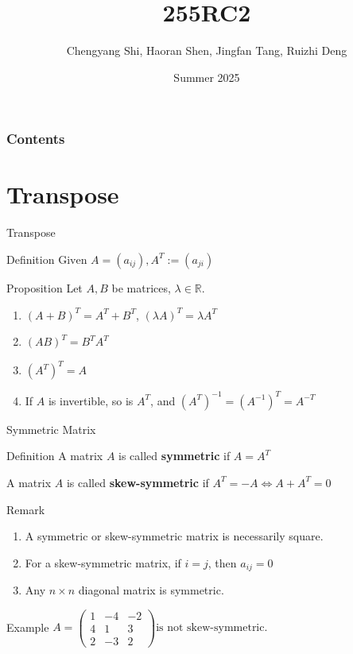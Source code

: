 \documentclass[aspectratio=169, UTF8]{ctexbeamer}
\title{\LARGE 255RC2}
\author{Chengyang Shi, Haoran Shen, Jingfan Tang, Ruizhi Deng}
\date{Summer 2025}
\begin{document}
\maketitle


\begin{frame}
    \frametitle{Contents}
    \tableofcontents     %
\end{frame}






\section{Transpose}
\begin{frame}{Transpose}
    \begin{block}{Definition}
        $\text{Given } A = (a_{ij}), A^T := (a_{ji})$
    \end{block}

    \begin{block}{Proposition}
        Let $A, B$ be matrices, $\lambda \in \mathbb{R}$.
        \begin{enumerate}
            \item $(A+B)^T = A^T + B^T$, $(\lambda A)^T = \lambda A^T $
            \item $(AB)^T = B^T A^T$
            \item $(A^T)^T = A$
            \item If $A$ is invertible, so is $A^T$, and $(A^T)^{-1} = (A^{-1})^T = A^{-T}$
        \end{enumerate}
    \end{block}
\end{frame}
\begin{frame}{Symmetric Matrix}
    \begin{block}{Definition}
        A matrix $A$ is called \textbf{symmetric} if $A = A^T$

        A matrix $A$ is called \textbf{skew-symmetric} if $A^T = -A \iff A + A^T = 0$
    \end{block}
    \begin{block}{Remark}
        \begin{enumerate}
            \item A symmetric or skew-symmetric matrix is necessarily square.
            \item For a skew-symmetric matrix, if $i=j$, then $a_{ij} = 0$
            \item Any $n \times n$ diagonal matrix is symmetric.
        \end{enumerate}
    \end{block}
    \begin{block}{Example}
        $A = \begin{pmatrix} 1 & -4 & -2 \\ 4 & 1 & 3 \\ 2 & -3 & 2 \end{pmatrix} \text{is not skew-symmetric.}$
    \end{block}
\end{frame}
\end{document}
